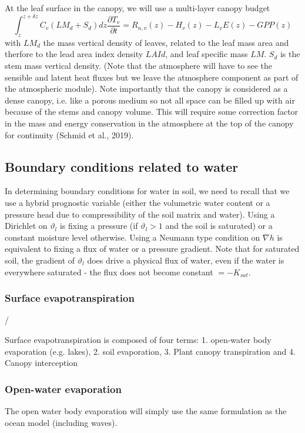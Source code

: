 \documentclass[twoside,10pt]{report}
\begin{document}
At the leaf surface in the canopy, we will use a multi-layer canopy budget
\begin{equation}
    \int_z^{z+\delta z}{C_v (LM_d+S_d) dz\frac{\partial T_v}{\partial t}} = R_{n,v}(z) -H_v(z)-L_vE(z)-GPP(z)
\end{equation}
with $LM_d$ the mass vertical density of leaves, related to the leaf mass area and therfore to the lead area index density $LAId$, and leaf specific mass $LM$. $S_d$ is the stem mass vertical density.
(Note that the atmosphere will have to see the sensible and latent heat fluxes but we leave the atmosphere component as part of the atmospheric module). Note importantly that the canopy is considered as a dense canopy, i.e. like a porous medium so not all space can be filled up with air because of the stems and canopy volume. This will require some correction factor in the mass and energy conservation in the atmosphere at the top of the canopy for continuity (Schmid et al., 2019).

\subsection{Boundary conditions related to water}
In determining boundary conditions for water in soil, we need to recall that we use a hybrid prognostic variable (either the volumetric water content or a pressure head due to compressibility of the soil matrix and water). Using a Dirichlet on $\vartheta_l$ is fixing a pressure (if $\vartheta_l >1$ and the soil is saturated) or a constant moisture level otherwise. Using a Neumann type condition on $\nabla h$ is equivalent to fixing a flux of water or a pressure gradient.  Note that for saturated soil, the gradient of $\vartheta_l$ does drive a physical flux of water, even if the water is everywhere saturated - the flux does not become constant $ = -K_{sat}$.
\subsubsection{Surface evapotranspiration}

\citep{Smits12a}/

Surface evapotranspiration is composed of four terms: 1. open-water body evaporation (e.g. lakes), 2. soil evaporation, 3. Plant canopy transpiration and 4. Canopy interception
\subsubsection{Open-water evaporation}
The open water body evaporation will simply use the same formulation as the ocean model (including waves).
\end{document}
